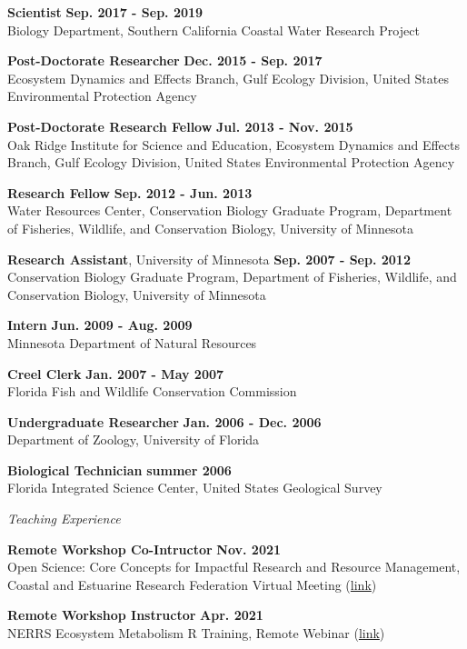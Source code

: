 \documentclass[letterpaper,12pt]{article}
\newcommand{\sectitle}[1]{\vspace{\baselineskip} \centerline{\large{\textit{#1}}}}
\begin{document}
{\bf Scientist} \hfill {\bf Sep. 2017 - Sep. 2019}\\
Biology Department, Southern California Coastal Water Research Project

{\bf Post-Doctorate Researcher} \hfill {\bf Dec. 2015 - Sep. 2017}\\
Ecosystem Dynamics and Effects Branch, Gulf Ecology Division, United States Environmental Protection Agency

{\bf Post-Doctorate Research Fellow} \hfill {\bf Jul. 2013 - Nov. 2015}\\
Oak Ridge Institute for Science and Education, Ecosystem Dynamics and Effects Branch, Gulf Ecology Division, United States Environmental Protection Agency

{\bf Research Fellow} \hfill {\bf Sep. 2012 - Jun. 2013} \\
Water Resources Center, Conservation Biology Graduate Program, Department of Fisheries, Wildlife, and Conservation Biology, University of Minnesota

{\bf Research Assistant}, University of Minnesota \hfill {\bf Sep. 2007 - Sep. 2012} \\
Conservation Biology Graduate Program, Department of Fisheries, Wildlife, and Conservation Biology, University of Minnesota

{\bf Intern} \hfill {\bf Jun. 2009 - Aug. 2009} \\
Minnesota Department of Natural Resources

{\bf Creel Clerk} \hfill {\bf Jan. 2007 - May 2007} \\
Florida Fish and Wildlife Conservation Commission

{\bf Undergraduate Researcher} \hfill {\bf Jan. 2006 - Dec. 2006} \\
Department of Zoology, University of Florida

{\bf Biological Technician} \hfill {\bf summer 2006} \\
Florida Integrated Science Center, United States Geological Survey

\sectitle{Teaching Experience}

{\bf Remote Workshop Co-Intructor} \hfill {\bf Nov. 2021}\\
Open Science: Core Concepts for Impactful Research and Resource Management, Coastal and Estuarine Research Federation Virtual Meeting ({\footnotesize\href{https://tbep-tech.github.io/cerf-os-workshop/}{link}})

{\bf Remote Workshop Instructor} \hfill {\bf Apr. 2021}\\
NERRS Ecosystem Metabolism R Training, Remote Webinar ({\footnotesize\href{https://tbep-tech.github.io/ecometab-r-training/}{link}})
\end{document}
